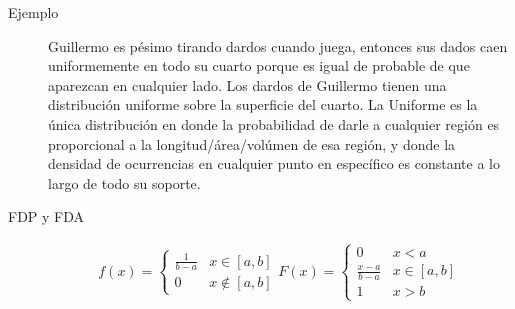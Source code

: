 \documentclass[12,landscape]{article}
\begin{document}
\begin{multicols*}{3}
\begin{description}
    \item[Ejemplo] Guillermo es pésimo tirando dardos cuando juega, entonces sus dados caen uniformemente en todo su cuarto porque es igual de probable de que aparezcan en cualquier lado. Los dardos de Guillermo tienen una distribución uniforme sobre la superficie del cuarto. La Uniforme es la única distribución en donde la probabilidad de darle a cualquier región es proporcional a la longitud/área/volúmen de esa región, y donde la densidad de ocurrencias en cualquier punto en específico es constante a lo largo de todo su soporte.
    \item[FDP y FDA]  
    
 \begin{eqnarray*}
    f(x) = \left\{
      \begin{array}{lr}
        \frac{1}{b-a} & x \in [a, b] \\
        0 &  x \notin [a, b]
      \end{array}
    \right.
    F(x) = \left\{
      \begin{array}{lr}
        0 & x < a \\
        \frac{x-a}{b-a} & x \in [a, b] \\
        1 &  x > b
      \end{array}
    \right. 
 \end{eqnarray*}

\end{description}


\end{multicols*}
\end{document}
